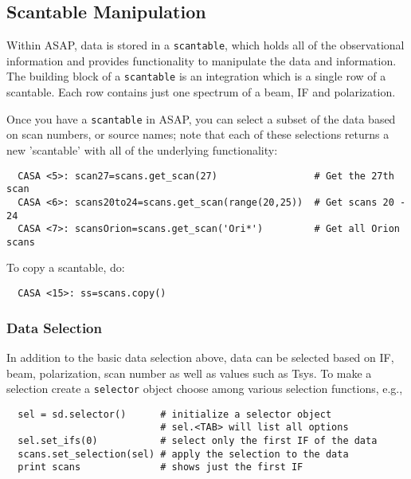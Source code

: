 \subsection{Scantable Manipulation}
\label{subsection:sd.asap.scantable}

Within ASAP, data is stored in a {\tt scantable}, which holds all of the
observational information and provides functionality to manipulate the
data and information. The building block of a {\tt scantable} is an
integration which is a single row of a scantable. Each row contains
just one spectrum of a beam, IF and polarization.  

Once you have a {\tt scantable} in ASAP, you can select a subset of the
data based on scan numbers, or source names; note that each
of these selections returns a new 'scantable' with all of the 
underlying functionality: 

\small
\begin{verbatim}
  CASA <5>: scan27=scans.get_scan(27)                 # Get the 27th scan
  CASA <6>: scans20to24=scans.get_scan(range(20,25))  # Get scans 20 - 24
  CASA <7>: scansOrion=scans.get_scan('Ori*')         # Get all Orion scans
\end{verbatim}
\normalsize

To copy a scantable, do:

\small
\begin{verbatim}
  CASA <15>: ss=scans.copy()
\end{verbatim}
\normalsize

\subsubsection{Data Selection}
\label{subsubsection:sd.asap.scantable.select}

In addition to the basic data selection above, data can be selected
based on IF, beam, polarization, scan number as well as values such as
Tsys.  To make a selection create a {\tt selector} object choose among various
selection functions, e.g., 

\small
\begin{verbatim}
  sel = sd.selector()      # initialize a selector object
                           # sel.<TAB> will list all options
  sel.set_ifs(0)           # select only the first IF of the data
  scans.set_selection(sel) # apply the selection to the data
  print scans              # shows just the first IF
\end{verbatim}
\normalsize

